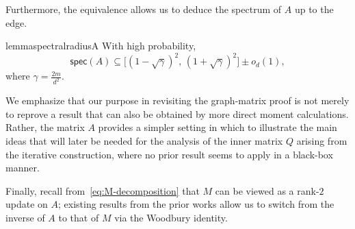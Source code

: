 \documentclass[12pt]{article}
\newcommand{\cm}{\mathsf{M} }
\begin{document}
 Furthermore, the equivalence allows us to deduce the spectrum 
 of $A$ up to the edge.


\begin{restatable}{lemma}{spectralradiusA} \label{lem:spectral-radius-A} 
With high probability, \[ \mathsf{spec}(A) \subseteq \bigl[(1-\sqrt{\gamma})^2,\,(1+\sqrt{\gamma})^2\bigr] \pm o_d(1), \] where \(\gamma = \frac{2m}{d^2}. \) \end{restatable}

We emphasize that our purpose in revisiting the graph-matrix proof is
not merely to reprove a result that can also be obtained by more direct moment
calculations. Rather, the matrix \(A\) provides a simpler setting in which to
illustrate the main ideas that will later be needed for the analysis of the
inner matrix \(Q\) arising from the iterative construction, where no prior result
seems to apply in a black-box manner.
%
 

Finally, recall from~\cref{eq:M-decomposition} that $M$ can be viewed as a rank-$2$ update on $A$; existing results from the prior works allow us to switch from the inverse of $A$ to that of $M$ via the Woodbury identity.
\end{document}
